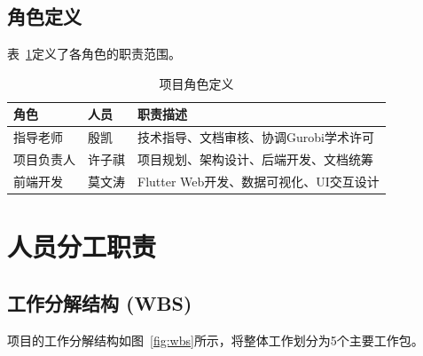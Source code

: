 \subsection{角色定义}

表~\ref{tab:roles}定义了各角色的职责范围。

\begin{table}[htbp]
    \centering
    \small
    \caption{项目角色定义}
    \label{tab:roles}
    \begin{tabular}{p{2cm}p{2cm}p{9cm}}
        \toprule
        \textbf{角色} & \textbf{人员} & \textbf{职责描述}              \\
        \midrule
        指导老师        & 殷凯          & 技术指导、文档审核、协调Gurobi学术许可     \\
        项目负责人       & 许子祺         & 项目规划、架构设计、后端开发、文档统筹        \\
        前端开发        & 莫文涛         & Flutter Web开发、数据可视化、UI交互设计 \\
        \bottomrule
    \end{tabular}
\end{table}

\section{人员分工职责}

\subsection{工作分解结构 (WBS)}

项目的工作分解结构如图~\ref{fig:wbs}所示，将整体工作划分为5个主要工作包。

